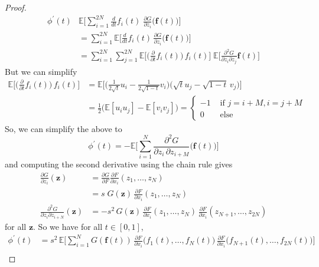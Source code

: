 \documentclass{article}
\begin{document}
\begin{proof}
  \begin{align*}
      \phi^\prime (t) & \mathbb{E}\bigg[ \sum_{i=1}^{2N} \frac{d}{dt} f_i (t) \; \frac{\partial G}{\partial z_i} \big( \mathbf{f}(t)\big) \bigg] \\
      & = \sum_{i=1}^{2N} \mathbb{E} \bigg[ \frac{d}{dt} f_i (t) \, \frac{\partial G}{\partial z_i} \big( \mathbf{f}(t)\big)\bigg] \\
      & = \sum_{i=1}^{2N} \sum_{j=1}^{2N} \mathbb{E} \bigg[ \Big( \frac{\partial}{\partial t} f_i (t) \Big) \, f_i (t) \bigg] \; \mathbb{E} \bigg[ \frac{\partial^2 G}{\partial z_i \partial z_{j}} \mathbf{f} (t) \bigg] 
  \end{align*}
  But we can simplify 
  \begin{align*}
      \mathbb{E} \bigg[ \Big( \frac{\partial}{\partial t} f_i (t) \Big) \, f_i (t) \bigg] & = \mathbb{E} \bigg[ \Big( \frac{1}{2 \sqrt{t}} u_i - \frac{1}{2 \sqrt{1 - t}} v_i \Big) \big( \sqrt{t} u_j - \sqrt{1 - t} \, v_j \big) \bigg] \\
      & = \frac{1}{2} \big(\mathbb{E}[ u_i u_j] - \mathbb{E}[v_i v_j] \big) = \begin{cases} -1 & \text{ if } j = i + M , i = j + M \\
      0 & \text{ else} \end{cases} 
  \end{align*}
  So, we can simplify the above to
  \[\phi^\prime (t) = - \mathbb{E} \bigg[  \sum_{i=1}^N \frac{\partial^2 G}{\partial z_i \, \partial z_{i + M}} \big( \mathbf{f}(t)\big) \bigg]\]
  and computing the second derivative using the chain rule gives 
  \begin{align*}
      \frac{\partial G}{\partial z_i} (\mathbf{z}) & = \frac{\partial G}{\partial F} \frac{\partial F}{\partial x_i} (z_1, \ldots, z_N) \\
      & = s \; G(\mathbf{z}) \, \frac{\partial F}{\partial x_i} (z_1, \ldots, z_N) \\
      \frac{\partial^2 G}{\partial z_i \partial z_{i + N}} (\mathbf{z}) & = - s^2 \, G(\mathbf{z}) \, \frac{\partial F}{\partial x_i} (z_1, \ldots, z_N) \, \frac{\partial F}{\partial x_i} (z_{N+1}, \ldots, z_{2N}) 
  \end{align*}
  for all $\mathbf{z}$. So we have for all $t \in [0, 1]$, 
  \begin{align*}
      \phi^\prime (t) & = s^2 \, \mathbb{E} \bigg[ \sum_{i=1}^N G(\mathbf{f}(t)) \, \frac{\partial F}{\partial x_i} \big( f_1 (t), \ldots, f_N (t) \big) \, \frac{\partial F}{\partial x_i} \big( f_{N+1} (t), \ldots, f_{2N} (t) \big) \bigg] \\ 

\end{align*}
\end{proof}
\end{document}
